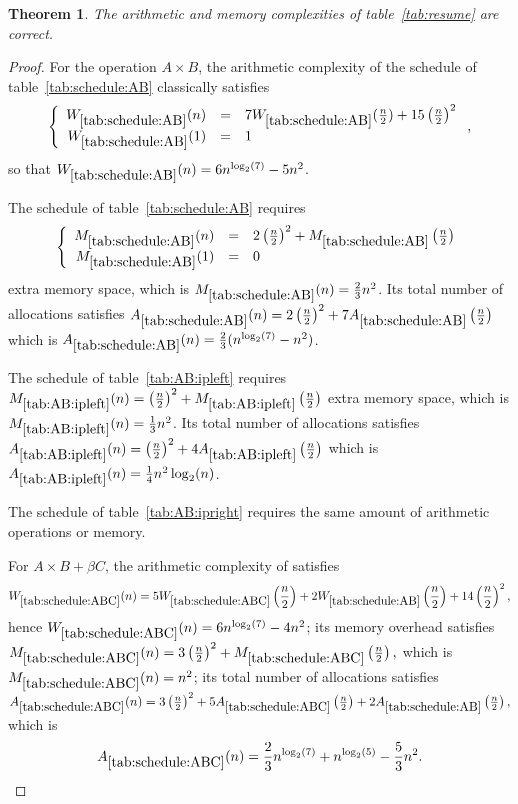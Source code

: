 \documentclass{article}
\newcommand{\hljjtt}{\cite{Huss-Lederman:1996:mai}\xspace}
\newtheorem{thm}{Theorem}
\begin{document}
\begin{thm}\label{thm:cost}
The arithmetic and memory complexities of table~\ref{tab:resume} are
correct.
\end{thm}
\begin{proof}
For the operation $A\times B$, the arithmetic complexity of the schedule of
table~\ref{tab:schedule:AB} classically satisfies
$$\left\{\begin{array}{rcl}
W_{\ref{tab:schedule:AB}}(n) &=& 7W_{\ref{tab:schedule:AB}}(\frac{n}{2})+15\left(\frac{n}{2}\right)^2\\
W_{\ref{tab:schedule:AB}}(1)&=&1
\end{array}\right.
,$$
so that $W_{\ref{tab:schedule:AB}}(n) = 6n^{\log_2(7)}-5n^2$.

The schedule of table~\ref{tab:schedule:AB} requires
$$
\left\{\begin{array}{rcl}
M_{\ref{tab:schedule:AB}}(n)&=&2\left(\frac{n}{2}\right)^2 +
       M_{\ref{tab:schedule:AB}}\left(\frac{n}{2}\right)\\
M_{\ref{tab:schedule:AB}}(1)&=&0
\end{array}\right.$$
extra memory space, which is $M_{\ref{tab:schedule:AB}}(n) = \frac{2}{3}n^2$. Its total
number of allocations satisfies
$
A_{\ref{tab:schedule:AB}}(n) = 2\left(\frac{n}{2}\right)^2 +
7A_{\ref{tab:schedule:AB}}\left(\frac{n}{2}\right)
$
which is $A_{\ref{tab:schedule:AB}}(n)=\frac{2}{3}(n^{\log_2(7)}-n^2)$.

The schedule of table~\ref{tab:AB:ipleft} requires
$M_{\ref{tab:AB:ipleft}}(n) =
\left(\frac{n}{2}\right)^2+M_{\ref{tab:AB:ipleft}}\left(\frac{n}{2}\right)$
extra memory space, which is $M_{\ref{tab:AB:ipleft}}(n) = \frac{1}{3}n^2$. Its
total number of allocations satisfies
$
A_{\ref{tab:AB:ipleft}}(n) = \left(\frac{n}{2}\right)^2 +
4A_{\ref{tab:AB:ipleft}}\left(\frac{n}{2}\right)
$
which is $A_{\ref{tab:AB:ipleft}}(n) = \frac{1}{4}n^2\log_2(n)$.

The schedule of table~\ref{tab:AB:ipright} requires the same amount of
arithmetic operations or memory.

For $A\times B + \beta C$, the arithmetic complexity of \hljjtt satisfies
$$W_{\ref{tab:schedule:ABC}}(n)=5W_{\ref{tab:schedule:ABC}}\left(\frac{n}{2}\right)+2W_{\ref{tab:schedule:AB}}\left(\frac{n}{2}\right)+14\left(\frac{n}{2}\right)^2,$$
hence $W_{\ref{tab:schedule:ABC}}(n)=6n^{\log_2(7)}-4n^2$; its memory overhead satisfies
$
M_{\ref{tab:schedule:ABC}}(n)=3\left(\frac{n}{2}\right)^2 +
  M_{\ref{tab:schedule:ABC}}\left(\frac{n}{2}\right),
$
which is $M_{\ref{tab:schedule:ABC}}(n)=n^2$; its total number of allocations satisfies
$
A_{\ref{tab:schedule:ABC}}(n)=3\left(\frac{n}{2}\right)^2 +
5A_{\ref{tab:schedule:ABC}}\left(\frac{n}{2}\right)+2A_{\ref{tab:schedule:AB}}\left(\frac{n}{2}\right),
$
which is
$$
A_{\ref{tab:schedule:ABC}}(n)=\frac{2}{3}n^{\log_2(7)}+n^{\log_2(5)}-\frac{5}{3}n^2.
$$


\end{proof}
\end{document}
